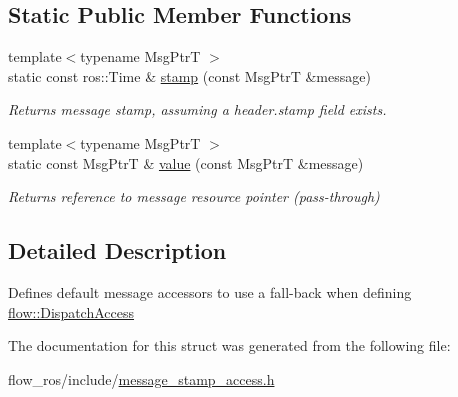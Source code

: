 \subsection*{Static Public Member Functions}
\begin{DoxyCompactItemize}
\item 
\mbox{\label{structflow__ros_1_1_default_message_stamp_dispatch_access_a6884c97715e2f638e8be4fc9923f1d2d}} 
{\footnotesize template$<$typename Msg\+PtrT $>$ }\\static const ros\+::\+Time \& \hyperlink{structflow__ros_1_1_default_message_stamp_dispatch_access_a6884c97715e2f638e8be4fc9923f1d2d}{stamp} (const Msg\+PtrT \&message)
\begin{DoxyCompactList}\small\item\em Returns message stamp, assuming a {\ttfamily header.\+stamp} field exists. \end{DoxyCompactList}\item 
\mbox{\label{structflow__ros_1_1_default_message_stamp_dispatch_access_a476ac2553180e355327cedc97bdb302d}} 
{\footnotesize template$<$typename Msg\+PtrT $>$ }\\static const Msg\+PtrT \& \hyperlink{structflow__ros_1_1_default_message_stamp_dispatch_access_a476ac2553180e355327cedc97bdb302d}{value} (const Msg\+PtrT \&message)
\begin{DoxyCompactList}\small\item\em Returns reference to message resource pointer (pass-\/through) \end{DoxyCompactList}\end{DoxyCompactItemize}


\subsection{Detailed Description}
Defines default message accessors to use a fall-\/back when defining {\ttfamily \hyperlink{structflow_1_1_dispatch_access}{flow\+::\+Dispatch\+Access}} 

The documentation for this struct was generated from the following file\+:\begin{DoxyCompactItemize}
\item 
flow\+\_\+ros/include/\hyperlink{message__stamp__access_8h}{message\+\_\+stamp\+\_\+access.\+h}\end{DoxyCompactItemize}
